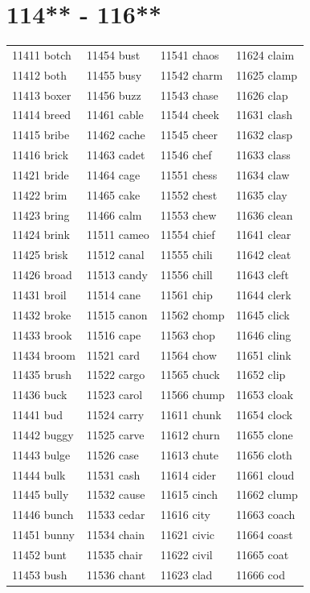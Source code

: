 \documentclass[10pt, oneside]{book}
\begin{document}
\begin{table}
	\centering
	\section*{114** - 116**}
	\begin{tabular}{l l l l}
11411 botch &11454 bust &11541 chaos &11624 claim\\
11412 both &11455 busy &11542 charm &11625 clamp\\
11413 boxer &11456 buzz &11543 chase &11626 clap\\
11414 breed &11461 cable &11544 cheek &11631 clash\\
11415 bribe &11462 cache &11545 cheer &11632 clasp\\
11416 brick &11463 cadet &11546 chef &11633 class\\
11421 bride &11464 cage &11551 chess &11634 claw\\
11422 brim &11465 cake &11552 chest &11635 clay\\
11423 bring &11466 calm &11553 chew &11636 clean\\
11424 brink &11511 cameo &11554 chief &11641 clear\\
11425 brisk &11512 canal &11555 chili &11642 cleat\\
11426 broad &11513 candy &11556 chill &11643 cleft\\
11431 broil &11514 cane &11561 chip &11644 clerk\\
11432 broke &11515 canon &11562 chomp &11645 click\\
11433 brook &11516 cape &11563 chop &11646 cling\\
11434 broom &11521 card &11564 chow &11651 clink\\
11435 brush &11522 cargo &11565 chuck &11652 clip\\
11436 buck &11523 carol &11566 chump &11653 cloak\\
11441 bud &11524 carry &11611 chunk &11654 clock\\
11442 buggy &11525 carve &11612 churn &11655 clone\\
11443 bulge &11526 case &11613 chute &11656 cloth\\
11444 bulk &11531 cash &11614 cider &11661 cloud\\
11445 bully &11532 cause &11615 cinch &11662 clump\\
11446 bunch &11533 cedar &11616 city &11663 coach\\
11451 bunny &11534 chain &11621 civic &11664 coast\\
11452 bunt &11535 chair &11622 civil &11665 coat\\
11453 bush &11536 chant &11623 clad &11666 cod\\
	\end{tabular}
 \end{table}
\clearpage
\end{document}
